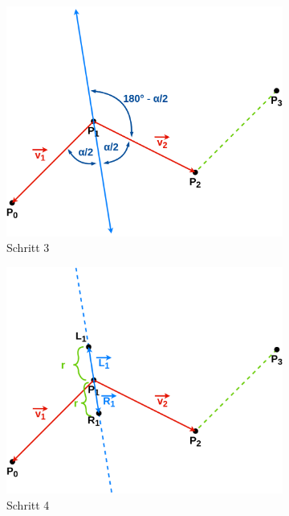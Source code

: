 \documentclass[doktyp=studarbeit]{TUBAFarbeiten}
\begin{document}
\begin{figure}[!htb]
    \qquad
    \begin{subfigure}[b]{0.45\textwidth}
        \centering
        \includegraphics[width=1\linewidth]{Schlangenlinie-3.png}
        \caption{Schritt 3}
    \end{subfigure}
    \qquad
    \begin{subfigure}[b]{0.45\textwidth}
        \centering
        \includegraphics[width=1\linewidth]{Schlangenlinie-4.png}
        \caption{Schritt 4}
    \end{subfigure}
    \qquad
    \begin{subfigure}[b]{0.45\textwidth}

\end{subfigure}
\end{figure}
\end{document}
